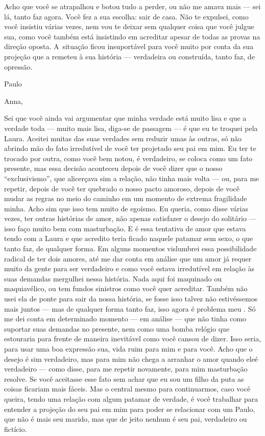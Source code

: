 Acho que você se atrapalhou e botou tudo a perder, ou não me amava mais
--- sei lá, tanto faz agora. Você fez a sua escolha: sair de casa. Não
te expulsei, como você insistiu várias vezes, nem vou te deixar sem
qualquer coisa que você julgue sua, como você também está insistindo em
acreditar apesar de todas as provas na direção oposta. A~situação ficou
insuportável para você muito por conta da sua projeção que a remeteu à
sua história --- verdadeira ou construída, tanto faz, de opressão.

\medskip{} 
\begin{flushright}Paulo\end{flushright}


\asterisc{}

Anna,

\medskip{} 

Sei que você ainda vai argumentar que minha verdade está muito lisa e
que a verdade toda --- muito mais lisa, diga-se de passagem --- é que eu
te troquei pela Laura. Aceitei muitas das suas verdades sem reduzir umas
às outras, só não abrindo mão do fato irredutível de você ter projetado
seu pai em mim. Eu ter te trocado por outra, como você bem notou, é
verdadeiro, se coloca como um fato presente, mas essa decisão aconteceu
depois de você dizer que o nosso ``exclusivismo'', que alicerçava sim a
relação, não tinha mais volta --- ou, para me repetir, depois de você
ter quebrado o nosso pacto amoroso, depois de você mudar as regras no
meio do caminho em um momento de extrema fragilidade minha. Acho sim que
isso tem muito de egoísmo. Eu queria, como disse várias vezes, ter
outras histórias de amor, não apenas satisfazer o desejo do solitário
--- isso faço muito bem com masturbação. E é essa tentativa de amor que
estava tendo com a Laura e que acredito teria ficado naquele patamar sem
sexo, o que tanto faz, de qualquer forma. Em alguns momentos vislumbrei
essa possibilidade radical de ter dois amores, até me dar conta em
análise que um amor já requer muito da gente para ser verdadeiro e como
você estava irredutível em relação às suas demandas mergulhei nessa
história. Nada aqui foi maquinado ou maquiavélico, ou tem fundos
sinistros como você quer acreditar. Também não usei ela de ponte para
sair da nossa história, se fosse isso talvez não estivéssemos mais
juntos --- mas de qualquer forma tanto faz, isso agora é problema meu .
Só me dei conta em determinado momento --- em análise --- que não tinha
como suportar suas demandas no presente, nem como uma bomba relógio que
estouraria para frente de maneira inevitável como você cansou de dizer.
Isso seria, para usar uma boa expressão sua, vida ruim para mim e para
você. Acho que o desejo é sim verdadeiro, mas para mim não chega a
arranhar o amor quando eleé verdadeiro --- como disse, para me repetir
novamente, para mim masturbação resolve. Se você aceitasse esse fato sem
achar que eu sou um filho da puta as coisas ficariam mais fáceis. Mas o
central mesmo para continuarmos, caso você queira, tendo uma relação com
algum patamar de verdade, é você trabalhar para entender a projeção do
seu pai em mim para poder se relacionar com um Paulo, que não é mais seu
marido, mas que de jeito nenhum é seu pai, verdadeiro ou fictício.

